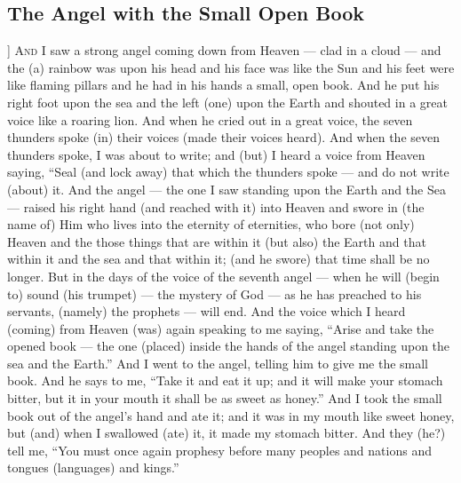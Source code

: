 \begin{pages}
\begin{Leftside}
        			\chapter{The Angel with the Small Open Book}
				]		
		\renewcommand{\LettrineFontHook}{\Zallmanfamily}
		\lettrine[lines=3]{A}{nd} I saw a strong angel coming down from Heaven — clad in a cloud — and the (a) rainbow was upon his head and his face was like the Sun and his feet were like flaming pillars and he had in his hands a small, open book. And he put his right foot upon the sea and the left (one) upon the Earth and shouted in a great voice like a roaring lion. And when he cried out in a great voice, the seven thunders spoke (in) their voices (made their voices heard). 
		\pend 
		\pstart
		And when the seven thunders spoke, I was about to write; and (but) I heard a voice from Heaven saying, “Seal (and lock away) that which the thunders spoke — and do not write (about) it. And the angel — the one I saw standing upon the Earth and the Sea — raised his right hand (and reached with it) into Heaven and swore in (the name of) Him who lives into the eternity of eternities, who bore (not only) Heaven and the those things that are within it (but also) the Earth and that within it and the sea and that within it; (and he swore) that time shall be no longer. 
		\pend
		\pstart
		But in the days of the voice of the seventh angel — when he will (begin to) sound (his trumpet) — the mystery of God — as he has preached to his servants, (namely) the prophets — will end. And the voice which I heard (coming) from Heaven (was) again speaking to me saying, “Arise and take the opened book — the one (placed) inside the hands of the angel standing upon the sea and the Earth.”
		\pend
		\pstart
		And I went to the angel, telling him to give me the small book. And he says to me, “Take it and eat it up; and it will make your stomach bitter, but it in your mouth it shall be as sweet as honey.” And I took the small book out of the angel’s hand and ate it; and it was in my mouth like sweet honey, but (and) when I swallowed (ate) it, it made my stomach bitter. And they (he?) tell me, “You must once again prophesy before many peoples and nations and tongues (languages) and kings.”
		\pend
        \endnumbering
    \end{Leftside}

\end{pages} 
\Pages

